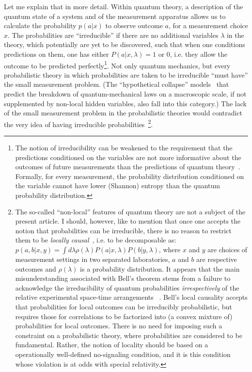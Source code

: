 \documentclass[12pt,a4]{article}
\begin{document}
Let me explain that in more detail. Within quantum theory, a description of the quantum state of a system and of the measurement apparatus allows us to calculate the probability $p(a|x)$ to observe outcome $a$, for a measurement choice $x$. The probabilities are ``irreducible'' if there are no additional variables $\lambda$ in the theory, which potentially are yet to be discovered, such that when one conditions predictions on them, one has either $P(a|x,\lambda)=1$ or $0$, i.e. they allow the outcome to be predicted perfectly\footnote{The notion of irreducibility can be weakened to the requirement that the predictions conditioned on the variables are not more informative about the outcomes of future measurements than the predictions of quantum theory~\cite{colbeck}. Formally, for every measurement, the probability distribution conditioned on the variable cannot have lower (Shannon) entropy than the quantum probability distribution.}. Not only quantum mechanics, but every probabilistic theory in which probabilities are taken to be irreducible ``must have'' the small measurement problem. (The ``hypothetical collapse'' models~\cite{GRW,diosi,penrose} that predict the breakdown of quantum-mechanical laws on a macroscopic scale, if not supplemented by non-local hidden variables, also fall into this category.) The lack of the small measurement problem in the probabilistic theories would contradict the very idea of having irreducible probabilities~\footnote{The so-called ``non-local'' features of quantum theory are not a subject of the present article. I should, however, like to mention that once one accepts the notion that probabilities can be irreducible, there is no reason to restrict them to be {\it locally causal}~\cite{bell}, i.e. to be decomposable as: $p(a,b|x,y) = \int d\lambda \rho(\lambda) P(a|x,\lambda) P(b|y,\lambda)$, where $x$ and $y$ are choices of measurement settings in two separated laboratories, $a$ and $b$ are respective outcomes and $\rho(\lambda)$ is a probability distribution. It appears that the main misunderstanding associated with Bell's theorem stems from a failure to acknowledge the irreducibility of quantum probabilities {\em irrespectively} of the relative experimental space-time arrangements ~\cite{marek}. Bell's local causality accepts that probabilities for local outcomes can be irreducibly probabilistic, but requires those for correlations to be factorized into (a convex mixture of) probabilities for local outcomes. There is no need for imposing such a constraint on a probabilistic theory, where probabilities are considered to be fundamental. Rather, the notion of locality should be based on a operationally well-defined no-signaling condition, and it is this condition whose violation is at odds with special relativity.}.
\end{document}
